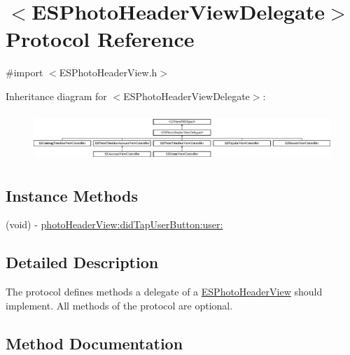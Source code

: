 \hypertarget{protocol_e_s_photo_header_view_delegate-p}{}\section{$<$E\+S\+Photo\+Header\+View\+Delegate$>$ Protocol Reference}
\label{protocol_e_s_photo_header_view_delegate-p}


{\ttfamily \#import $<$E\+S\+Photo\+Header\+View.\+h$>$}

Inheritance diagram for $<$E\+S\+Photo\+Header\+View\+Delegate$>$\+:\begin{figure}[H]
\begin{center}
\leavevmode
\includegraphics[height=1.828571cm]{protocol_e_s_photo_header_view_delegate-p}
\end{center}
\end{figure}
\subsection*{Instance Methods}
\begin{DoxyCompactItemize}
\item 
(void) -\/ \hyperlink{protocol_e_s_photo_header_view_delegate-p_ae2ba0af1da692c8b76a7ae30f9a1bfa1}{photo\+Header\+View\+:did\+Tap\+User\+Button\+:user\+:}
\end{DoxyCompactItemize}


\subsection{Detailed Description}
The protocol defines methods a delegate of a \hyperlink{interface_e_s_photo_header_view}{E\+S\+Photo\+Header\+View} should implement. All methods of the protocol are optional. 

\subsection{Method Documentation}
\hypertarget{protocol_e_s_photo_header_view_delegate-p_ae2ba0af1da692c8b76a7ae30f9a1bfa1}{}

